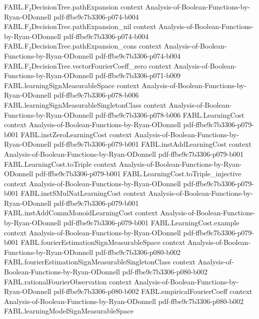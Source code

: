 \begin{theorem}
  {FABL.F₂DecisionTree.pathExpansion}
  {context}
  {Analysis-of-Boolean-Functions-by-Ryan-ODonnell}
  {pdf-ffbe9c7b3306-p074-b004}
\proofstep
  {FABL.F₂DecisionTree.pathExpansion_nil}
  {context}
  {Analysis-of-Boolean-Functions-by-Ryan-ODonnell}
  {pdf-ffbe9c7b3306-p074-b004}
\proofstep
  {FABL.F₂DecisionTree.pathExpansion_cons}
  {context}
  {Analysis-of-Boolean-Functions-by-Ryan-ODonnell}
  {pdf-ffbe9c7b3306-p074-b004}
\proofstep
  {FABL.F₂DecisionTree.vectorFourierCoeff_zero}
  {context}
  {Analysis-of-Boolean-Functions-by-Ryan-ODonnell}
  {pdf-ffbe9c7b3306-p071-b009}
\proofstep
  {FABL.learningSignMeasurableSpace}
  {context}
  {Analysis-of-Boolean-Functions-by-Ryan-ODonnell}
  {pdf-ffbe9c7b3306-p078-b006}
\proofstep
  {FABL.learningSignMeasurableSingletonClass}
  {context}
  {Analysis-of-Boolean-Functions-by-Ryan-ODonnell}
  {pdf-ffbe9c7b3306-p078-b006}
\proofstep
  {FABL.LearningCost}
  {context}
  {Analysis-of-Boolean-Functions-by-Ryan-ODonnell}
  {pdf-ffbe9c7b3306-p079-b001}
\proofstep
  {FABL.instZeroLearningCost}
  {context}
  {Analysis-of-Boolean-Functions-by-Ryan-ODonnell}
  {pdf-ffbe9c7b3306-p079-b001}
\proofstep
  {FABL.instAddLearningCost}
  {context}
  {Analysis-of-Boolean-Functions-by-Ryan-ODonnell}
  {pdf-ffbe9c7b3306-p079-b001}
\proofstep
  {FABL.LearningCost.toTriple}
  {context}
  {Analysis-of-Boolean-Functions-by-Ryan-ODonnell}
  {pdf-ffbe9c7b3306-p079-b001}
\proofstep
  {FABL.LearningCost.toTriple_injective}
  {context}
  {Analysis-of-Boolean-Functions-by-Ryan-ODonnell}
  {pdf-ffbe9c7b3306-p079-b001}
\proofstep
  {FABL.instSMulNatLearningCost}
  {context}
  {Analysis-of-Boolean-Functions-by-Ryan-ODonnell}
  {pdf-ffbe9c7b3306-p079-b001}
\proofstep
  {FABL.instAddCommMonoidLearningCost}
  {context}
  {Analysis-of-Boolean-Functions-by-Ryan-ODonnell}
  {pdf-ffbe9c7b3306-p079-b001}
\proofstep
  {FABL.LearningCost.example}
  {context}
  {Analysis-of-Boolean-Functions-by-Ryan-ODonnell}
  {pdf-ffbe9c7b3306-p079-b001}
\proofstep
  {FABL.fourierEstimationSignMeasurableSpace}
  {context}
  {Analysis-of-Boolean-Functions-by-Ryan-ODonnell}
  {pdf-ffbe9c7b3306-p080-b002}
\proofstep
  {FABL.fourierEstimationSignMeasurableSingletonClass}
  {context}
  {Analysis-of-Boolean-Functions-by-Ryan-ODonnell}
  {pdf-ffbe9c7b3306-p080-b002}
\proofstep
  {FABL.rationalFourierObservation}
  {context}
  {Analysis-of-Boolean-Functions-by-Ryan-ODonnell}
  {pdf-ffbe9c7b3306-p080-b002}
\proofstep
  {FABL.empiricalFourierCoeff}
  {context}
  {Analysis-of-Boolean-Functions-by-Ryan-ODonnell}
  {pdf-ffbe9c7b3306-p080-b002}
\proofstep
  {FABL.learningModelSignMeasurableSpace}

\end{theorem}

